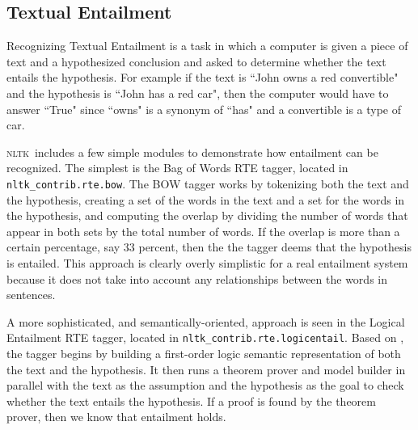 \documentclass[11pt,a4paper]{article}
\newcommand{\NLTK}{\textsc{nltk}}
\newcommand{\dhgcode}[1]{{\tt #1}}
\begin{document}


\subsection{Textual Entailment}
Recognizing Textual Entailment is a task in which a computer is given
a piece of text and a hypothesized conclusion and asked to determine
whether the text entails the hypothesis.  For example if the text is
``John owns a red convertible" and the hypothesis is ``John has a red
car", then the computer would have to answer ``True" since ``owns" is
a synonym of ``has" and a convertible is a type of car.

\NLTK\ includes a few simple modules to demonstrate how entailment can
be recognized.  The simplest is the Bag of Words RTE tagger, located
in \dhgcode{nltk\_contrib.rte.bow}.  The BOW tagger works by
tokenizing both the text and the hypothesis, creating a set of the
words in the text and a set for the words in the hypothesis, and
computing the overlap by dividing the number of words that appear in
both sets by the total number of words.  If the overlap is more than a
certain percentage, say 33 percent, then the the tagger deems that the
hypothesis is entailed.  This approach is clearly overly simplistic
for a real entailment system because it does not take into account any
relationships between the words in sentences.

A more sophisticated, and semantically-oriented, approach is seen in
the Logical Entailment RTE tagger, located in
\dhgcode{nltk\_contrib.rte.logicentail}.  Based on \cite{BosRTE}, the
tagger begins by building a first-order logic semantic representation
of both the text and the hypothesis.  It then runs a theorem prover
and model builder in parallel with the text as the assumption and the
hypothesis as the goal to check whether the text entails the
hypothesis.  If a proof is found by the theorem prover, then we know
that entailment holds.
\end{document}
